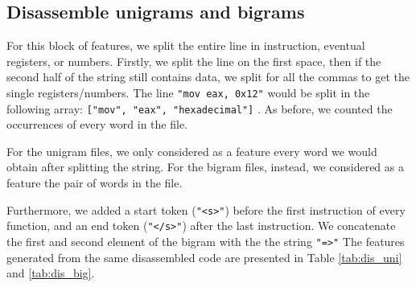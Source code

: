 \subsection{Disassemble unigrams and bigrams}
For this block of features, we split the entire line in instruction, eventual registers, or numbers. Firstly, we split the line on the first space, then if the second half of the string still contains data, we split for all the commas to get the single registers/numbers. The line \texttt{"mov eax, 0x12"} would be split in the following array: \texttt{["mov", "eax", "hexadecimal"]} . As before, we counted the occurrences of every word in the file. 

For the unigram files, we only considered as a feature every word we would obtain after splitting the string. For the bigram files, instead, we considered as a feature the pair of words in the file. 

Furthermore, we added a start token (\texttt{"<s>"}) before the first instruction of every function, and an end token (\texttt{"</s>"}) after the last instruction. We concatenate the first and second element of the bigram with the the string \texttt{"=>"} The features generated from the same disassembled code are presented in Table \ref{tab:dis_uni} and \ref{tab:dis_big}.

